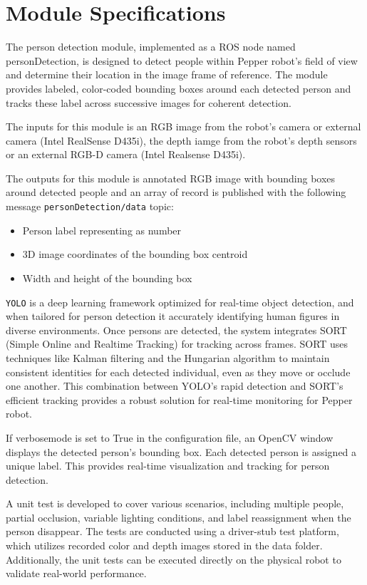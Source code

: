 \documentclass{CSSRforAfrica}
\begin{document}
\newpage	

\section{Module Specifications}
The person detection module, implemented as a ROS node named personDetection, is designed to detect people within Pepper robot's field of view and determine their location in the image frame of reference. The module provides labeled, color-coded bounding boxes around each detected person and tracks these label across successive images for coherent detection. 

The inputs for this module is an RGB image from the robot's camera or external camera (Intel RealSense D435i), the depth iamge from the robot's depth sensors or an external RGB-D camera (Intel Realsense D435i).

The outputs for this module is annotated RGB image with bounding boxes around detected people and an array of record is published with the following message \texttt{personDetection/data} topic:
\begin{itemize}
	\item Person label representing as number
	\item 3D image coordinates of the bounding box centroid
	\item Width and height of the bounding box
\end{itemize}

\texttt{YOLO} is a deep learning framework optimized for real-time object detection, and when tailored for person detection it accurately identifying human figures in diverse environments. Once persons are detected, the system integrates SORT (Simple Online and Realtime Tracking) for tracking across frames. SORT uses techniques like Kalman filtering and the Hungarian algorithm to maintain consistent identities for each detected individual, even as they move or occlude one another. This combination between YOLO's rapid detection and SORT's efficient tracking provides a robust solution for real-time monitoring for Pepper robot.\cite{yolo}

If verbosemode is set to True in the configuration file, an OpenCV window displays the detected person's bounding box. Each detected person is assigned a unique label. This provides real-time visualization and tracking for person detection. 

A unit test is developed to cover various scenarios, including multiple people, partial occlusion, variable lighting conditions, and label reassignment when the person disappear. The tests are conducted using a driver-stub test platform, which utilizes recorded color and depth images stored in the data folder. Additionally, the unit tests can be executed directly on the physical robot to validate real-world performance.
\end{document}
